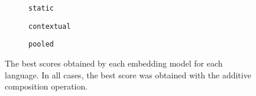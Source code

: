 \begin{figure}
  \centering
  \begin{subfigure}[b]{\textwidth}
    \centering
    \caption{\texttt{static}}
  \end{subfigure}
  \par\bigskip\par\bigskip
  \begin{subfigure}[b]{\textwidth}
    \centering
    \caption{\texttt{contextual}}
  \end{subfigure}
  \par\bigskip\par\bigskip
  \begin{subfigure}[b]{\textwidth}
    \centering
    \caption{\texttt{pooled}}
  \end{subfigure}
  \caption{The best scores obtained by each embedding model for each language.
    In all cases, the best score was obtained with the additive composition operation.
  }
  \label{table:best-score}
\end{figure}
